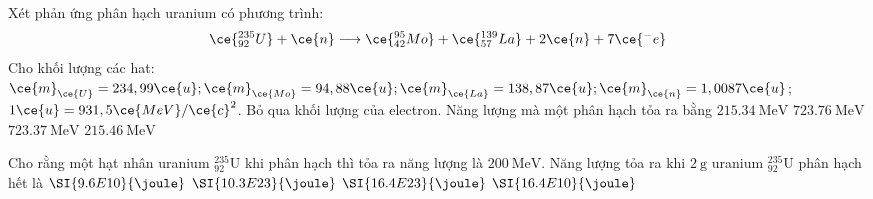 \begin{ex}
	Xét phản ứng phân hạch uranium có phương trình:
	$$
	\ce{_{92}^{235}U}+\ce{n} \longrightarrow\ce{_{42}^{95}Mo}+\ce{_{57}^{139}La}+2 \ce{n}+7 \ce{^{-}e}
	$$
	Cho khối lượng các hat: $\ce{m}_{\ce{U}}=234,99 \ce{u} ; \ce{m}_{\ce{Mo}}=94,88 \ce{u} ; \ce{m}_{\ce{La}}=138,87 \ce{u} ; \ce{m}_{\ce{n}}=1,0087 \ce{u}$; $1 \ce{u}=931,5 \ce{MeV} / \ce{c}^2$. Bỏ qua khối lượng của electron. Năng lượng mà một phân hạch tỏa ra bằng	
	\choice
	{$\SI{215.34}{\mega\electronvolt}$}
	{$\SI{723.76}{\mega\electronvolt}$}
	{$\SI{723.37}{\mega\electronvolt}$}
	{\True $\SI{215.46}{\mega\electronvolt}$}
\end{ex}
\begin{ex}
	Cho rằng một hạt nhân uranium $\mathrm{_{92}^{235}U}$ khi phân hạch thì tỏa ra năng lượng là $\SI{200}{\mega\electronvolt}$. Năng lượng tỏa ra khi $\SI{2}{\gram}$ uranium $\mathrm{_{92}^{235}U}$ phân hạch hết là
	\choice
	{$\SI{9.6E10}{\joule}$}
	{$\SI{10.3E23}{\joule}$}
	{$\SI{16.4E23}{\joule}$}
	{\True $\SI{16.4E10}{\joule}$}
\end{ex}
